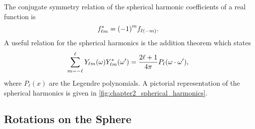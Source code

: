 %
The conjugate symmetry relation of the spherical harmonic coefficients of a real function is
%
\begin{equation}
	\conj{\harmonic{f}}
	= \phaseFactor f_{\ell(-m)}.
\end{equation}
%
A useful relation for the spherical harmonics is the addition theorem which states
%
\begin{equation}\label{eq:chapter2_addition_theorem}
	\sum\limits_{m=-\ell}^{\ell} \pixel{\harmonic{Y}} \pixel[']{\conj{\harmonic{Y}}}
	= \factor P_{\ell}(\omega \cdot \omega'),
\end{equation}
%
where \(P_{\ell}(x)\) are the Legendre polynomials.
A pictorial representation of the spherical harmonics is given in \cref{fig:chapter2_spherical_harmonics}.



\subsection{Rotations on the Sphere}\label{sec:chapter2_rotations_sphere}

